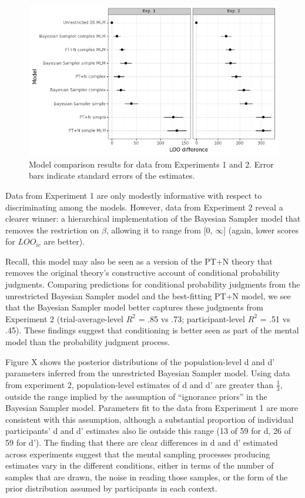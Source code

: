 \documentclass[
  english,
  man,floatsintext]{apa6}
\begin{document}
\begin{figure}[ht]
\centering
\includegraphics[width=6in]{plot_compare.png}
\caption{Model comparison results for data from Experiments 1 and 2. Error bars indicate standard errors of the estimates.}
\end{figure}

Data from Experiment 1 are only modestly informative with respect to discriminating among the models. However, data from Experiment 2 reveal a clearer winner: a hierarchical implementation of the Bayesian Sampler model that removes the restriction on \(\beta\), allowing it to range from {[}0, \(\infty\){]} (again, lower scores for \(LOO_{ic}\) are better).

Recall, this model may also be seen as a version of the PT+N theory that removes the original theory's constructive account of conditional probability judgments. Comparing predictions for conditional probability judgments from the unrestricted Bayesian Sampler model and the best-fitting PT+N model, we see that the Bayesian Sampler model better captures these judgments from Experiment 2 (trial-average-level \(R^2\) = .85 vs .73; participant-level \(R^2\) = .51 vs .45). These findings suggest that conditioning is better seen as part of the mental model than the probability judgment process.

Figure X shows the posterior distributions of the population-level d and d' parameters inferred from the unrestricted Bayesian Sampler model. Using data from experiment 2, population-level estimates of d and d' are greater than \(\frac{1}{3}\), outside the range implied by the assumption of ``ignorance priors'' in the Bayesian Sampler model. Parameters fit to the data from Experiment 1 are more consistent with this assumption, although a substantial proportion of individual participants' d and d' estimates also lie outside this range (13 of 59 for d, 26 of 59 for d'). The finding that there are clear differences in d and d' estimated across experiments suggest that the mental sampling processes producing estimates vary in the different conditions, either in terms of the number of samples that are drawn, the noise in reading those samples, or the form of the prior distribution assumed by participants in each context.
\end{document}
